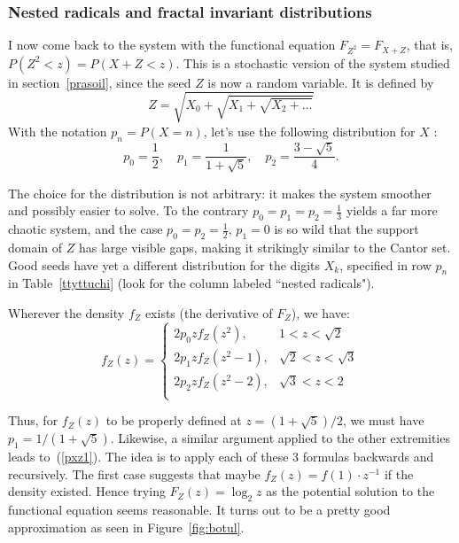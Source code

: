 \documentclass[oneside,10pt]{book}
\begin{document}


\subsubsection{Nested radicals and fractal invariant distributions}

I now come back to the system with the functional equation  $F_{Z^2} = F_{X+Z}$, that is,
 $P(Z^2<z) = P(X+Z<z)$. This is a stochastic version of the system studied in section~\ref{prasoil}, since the seed $Z$ is now a
 random variable. It is defined by  
$$Z=\sqrt{X_0+\sqrt{X_1+\sqrt{X_2+\dots}}}$$
With the notation $p_n=P(X=n)$, let's use the following distribution for $X$ : 
\begin{equation}
p_0 = \frac{1}{2}, \quad p_1 = \frac{1}{1 + \sqrt{5}}, \quad p_2 = \frac{3 - \sqrt{5}}{4}. \label{pxz1}
\end{equation} 

The choice for the distribution is not arbitrary: it makes the system smoother and possibly easier to solve. To the contrary 
$p_0 = p_1= p_2 = \frac{1}{3}$ yields a far more chaotic system, and the 
case $p_0 = p_2 = \frac{1}{2}$, $p_1=0$ is so wild that the support domain of $Z$ has large visible gaps, making it strikingly  
similar to the \textcolor{index}{Cantor set}.  Good seeds have yet a different distribution for the digits
 $X_k$, specified in row $p_n$ in Table~\ref{ttyttuchi} (look for the column labeled ``nested radicals").

Wherever the density $f_Z$ exists (the derivative of $F_Z$), we have:
\begin{equation}
f_Z(z)= 
\begin{cases}
 2p_0 z f_Z(z^2), & 1<z<\sqrt{2}      \nonumber    \\[2pt]  
 2p_1 z f_Z(z^2 -1), & \sqrt{2}<z<\sqrt{3}   \nonumber \\[2pt]  
 2p_2 z f_Z(z^2 -2), & \sqrt{3}<z<2    \nonumber \\ 
\end{cases}
\end{equation}

Thus, for $f_Z(z)$ to be properly defined at $z = (1+\sqrt{5})/2$, we must have $p_1=1/(1+\sqrt{5})$. Likewise, 
 a similar argument applied to the other extremities leads to~(\ref{pxz1}). The idea is to apply each of these 3 formulas
 backwards and recursively. The first case suggests that maybe $f_Z(z)=f(1)\cdot z^{-1}$ if the density existed. Hence trying
 $F_Z(z)=\log_2 z$ as the potential solution to the functional equation seems reasonable.  It 
turns out to be a pretty good approximation as seen in Figure~\ref{fig:botul}.
\end{document}

